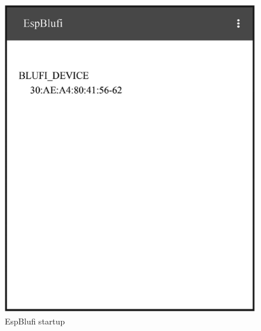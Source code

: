 \documentclass[a4paper,12pt,openany]{book}
\begin{document}
\begin{figure}[!h]
  \Centering
  \begin{minipage}[b]{0.4\textwidth}
    \includegraphics[height=1.3\textwidth]{D7Z/7-40}
    \caption{EspBlufi startup}
  \end{minipage}\hspace{2em}
  \begin{minipage}[b]{0.4\textwidth}

\end{minipage}
\end{figure}
\end{document}
